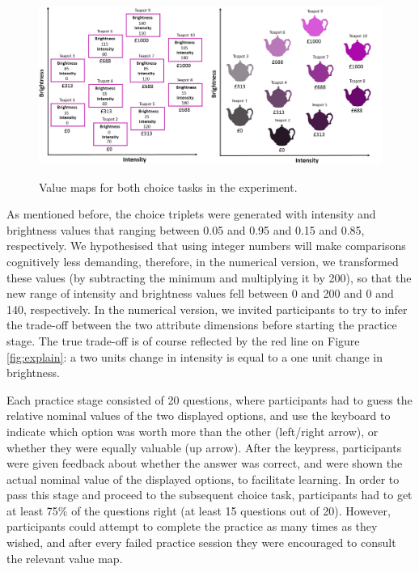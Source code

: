 \documentclass[11pt,a4paper]{article}
\begin{document}
\begin{figure}
\centering
\caption{Value maps for both choice tasks in the experiment.}
\includegraphics[width=1\textwidth]{value_maps.png}
\label{fig:valuemaps}
\end{figure}

As mentioned before, the choice triplets were generated with intensity and brightness values that ranging between 0.05 and 0.95 and 0.15 and 0.85, respectively.  We hypothesised that using integer numbers will make comparisons cognitively less demanding, therefore, in the numerical version, we transformed these values (by subtracting the minimum and multiplying it by 200), so that the new range of intensity and brightness values fell between 0 and 200 and 0 and 140, respectively. In the numerical version, we invited participants to try to infer the trade-off between the two attribute dimensions before starting the practice stage. The true trade-off is of course reflected by the red line on Figure \ref{fig:explain}: a two units change in intensity is equal to a one unit change in brightness.

Each practice stage consisted of 20 questions, where participants had to guess the relative nominal values of the two displayed options, and use the keyboard to indicate which option was worth more than the other (left/right arrow), or whether they were equally valuable (up arrow). After the keypress, participants were given feedback about whether the answer was correct, and were shown the actual nominal value of the displayed options, to facilitate learning.
In order to pass this stage and proceed to the subsequent choice task, participants had to get at least 75\% of the questions right (at least 15 questions out of 20). However, participants could attempt to complete the practice as many times as they wished, and after every failed practice session they were encouraged to consult the relevant value map. 
\end{document}
